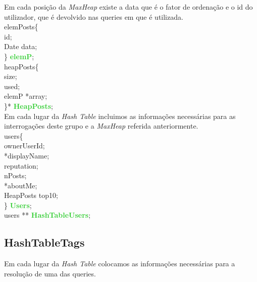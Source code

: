 \documentclass[10pt,a4paper]{article}
\begin{document}
Em cada posição da \textit{MaxHeap} existe a data que é o fator de ordenação e o id do utilizador, que é devolvido nas queries em que é utilizada.\\

 \noindent {\bf{\textcolor{Emerald}{typedef struct}}} elemPosts\{\\
    \indent {\bf{\textcolor{Emerald}{long}}} id;  \\
    \indent Date data; \\
\} {\bf{\textcolor{LimeGreen}{elemP}}};\\

 \noindent {\bf{\textcolor{Emerald}{typedef struct}}} heapPosts\{\\
    \indent {\bf{\textcolor{Emerald}{int}}}  size; \\
    \indent {\bf{\textcolor{Emerald}{int}}}   used; \\
    \indent elemP *array;\\
\}* {\bf{\textcolor{LimeGreen}{HeapPosts}}};\\

Em cada lugar da \textit{Hash Table} incluimos as informações necessárias para as interrogações deste grupo e a \textit{MaxHeap} referida anteriormente.\\  

 \noindent {\bf{\textcolor{Emerald}{typedef struct}}} users\{\\
	 \indent {\bf{\textcolor{Emerald}{long}}} ownerUserId; \\
	 \indent {\bf{\textcolor{Emerald}{char}}} *displayName; \\
	 \indent {\bf{\textcolor{Emerald}{int}}} reputation; \\
	 \indent {\bf{\textcolor{Emerald}{int}}} nPosts; \\
	 \indent {\bf{\textcolor{Emerald}{char}}} *aboutMe;\\
	 \indent HeapPosts top10;\\
\} {\bf{\textcolor{LimeGreen}{Users}}};\\

 \noindent {\bf{\textcolor{Emerald}{typedef struct}}} users ** {\bf{\textcolor{LimeGreen}{HashTableUsers}}};

\subsection{HashTableTags}

Em cada lugar da \textit{Hash Table} colocamos as informações necessárias para a resolução de uma das queries. \\  
\end{document}
